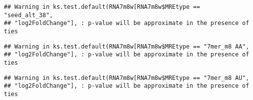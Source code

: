 \documentclass[
]{article}
\newenvironment{Shaded}{\begin{snugshade}}{\end{snugshade}}
\newcommand{\FunctionTok}[1]{\textcolor[rgb]{0.13,0.29,0.53}{\textbf{#1}}}
\newcommand{\NormalTok}[1]{#1}
\newcommand{\OtherTok}[1]{\textcolor[rgb]{0.56,0.35,0.01}{#1}}
\newcommand{\SpecialCharTok}[1]{\textcolor[rgb]{0.81,0.36,0.00}{\textbf{#1}}}
\newcommand{\StringTok}[1]{\textcolor[rgb]{0.31,0.60,0.02}{#1}}
\begin{document}
\begin{verbatim}
## Warning in ks.test.default(RNA7m8w[RNA7m8w$MREtype == "seed_alt_38",
## "log2FoldChange"], : p-value will be approximate in the presence of ties
\end{verbatim}

\begin{Shaded}
\end{Shaded}

\begin{verbatim}
## Warning in ks.test.default(RNA7m8w[RNA7m8w$MREtype == "7mer_m8 AA",
## "log2FoldChange"], : p-value will be approximate in the presence of ties
\end{verbatim}

\begin{Shaded}
\end{Shaded}

\begin{verbatim}
## Warning in ks.test.default(RNA7m8w[RNA7m8w$MREtype == "7mer_m8 AU",
## "log2FoldChange"], : p-value will be approximate in the presence of ties
\end{verbatim}

\begin{Shaded}
\end{Shaded}
\end{document}
